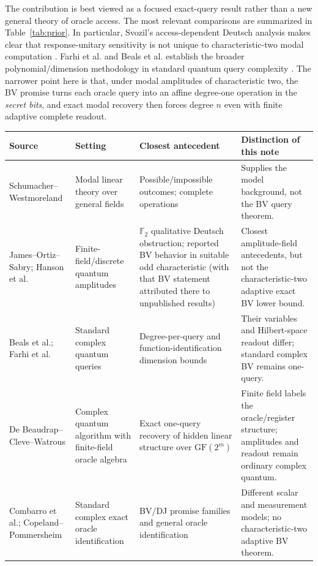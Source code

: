 \documentclass[11pt]{article}
\newcommand{\F}{\mathbb F}
\begin{document}
The contribution is best viewed as a focused exact-query result rather than a new general theory of oracle access. The most relevant comparisons are summarized in Table~\ref{tab:prior}. In particular, Svozil's access-dependent Deutsch analysis makes clear that response-unitary sensitivity is not unique to characteristic-two modal computation \cite{Svozil2026}. Farhi et al. and Beals et al. establish the broader polynomial/dimension methodology in standard quantum query complexity \cite{Farhi1999,Beals2001}. The narrower point here is that, under modal amplitudes of characteristic two, the BV promise turns each oracle query into an affine degree-one operation in the \emph{secret bits}, and exact modal recovery then forces degree $n$ even with finite adaptive complete readout.

\begin{table}[ht]\centering\scriptsize
\begin{tabular}{@{}L{.16\linewidth}L{.21\linewidth}L{.25\linewidth}L{.28\linewidth}@{}}\toprule
Source & Setting & Closest antecedent & Distinction of this note\\\midrule
Schumacher--Westmoreland \cite{Schumacher2010,Schumacher2012} & Modal linear theory over general fields & Possible/impossible outcomes; complete operations & Supplies the model background, not the BV query theorem.\\
James--Ortiz--Sabry; Hanson et al. \cite{James2011,Hanson2014} & Finite-field/discrete quantum amplitudes & $\F_2$ qualitative Deutsch obstruction; reported BV behavior in suitable odd characteristic (with that BV statement attributed there to unpublished results) & Closest amplitude-field antecedents, but not the characteristic-two adaptive exact BV lower bound.\\
Beals et al.; Farhi et al. \cite{Beals2001,Farhi1999} & Standard complex quantum queries & Degree-per-query and function-identification dimension bounds & Their variables and Hilbert-space readout differ; standard complex BV remains one-query.\\
De Beaudrap--Cleve--Watrous \cite{deBeaudrap2002} & Complex quantum algorithm with finite-field oracle algebra & Exact one-query recovery of hidden linear structure over $\mathrm{GF}(2^m)$ & Finite field labels the oracle/register structure; amplitudes and readout remain ordinary complex quantum.\\
Combarro et al.; Copeland--Pommersheim \cite{Combarro2021,Copeland2021} & Standard complex exact oracle identification & BV/DJ promise families and general oracle identification & Different scalar and measurement models; no characteristic-two adaptive BV theorem.\\

\end{tabular}
\end{table}
\end{document}
